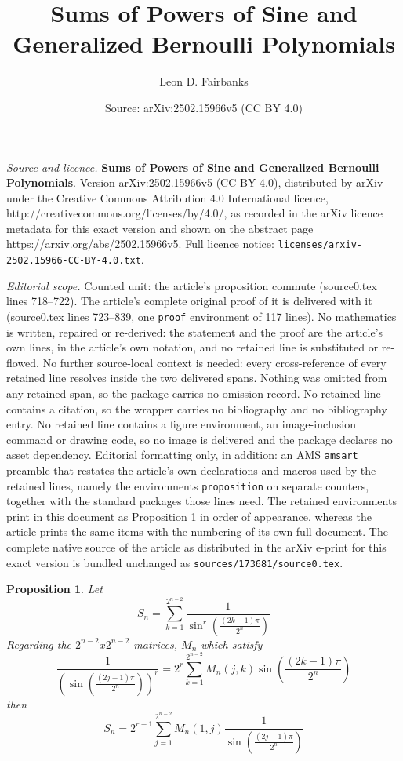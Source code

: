 \documentclass[10pt,a4paper]{amsart}
\title{{\textbf{Sums of Powers of Sine and Generalized Bernoulli Polynomials}}}
\author{Leon D. Fairbanks}
\date{Source: arXiv:2502.15966v5 (CC BY 4.0)}
\newtheorem{proposition}{Proposition}
\begin{document}
\maketitle

\noindent\emph{Source and licence.} {\textbf{Sums of Powers of Sine and Generalized Bernoulli Polynomials}}. Version arXiv:2502.15966v5 (CC BY 4.0), distributed by arXiv under the Creative Commons Attribution 4.0 International licence, http://creativecommons.org/licenses/by/4.0/, as recorded in the arXiv licence metadata for this exact version and shown on the abstract page https://arxiv.org/abs/2502.15966v5. Full licence notice: \texttt{licenses/arxiv-2502.15966-CC-BY-4.0.txt}.\par\smallskip

\noindent\textit{Editorial scope.} Counted unit: the article's proposition commute (source0.tex lines 718--722). The article's complete original proof of it is delivered with it (source0.tex lines 723--839, one \texttt{proof} environment of 117 lines). No mathematics is written, repaired or re-derived: the statement and the proof are the article's own lines, in the article's own notation, and no retained line is substituted or re-flowed.  No further source-local context is needed: every cross-reference of every retained line resolves inside the two delivered spans.  Nothing was omitted from any retained span, so the package carries no omission record.  No retained line contains a citation, so the wrapper carries no bibliography and no bibliography entry.  No retained line contains a figure environment, an image-inclusion command or drawing code, so no image is delivered and the package declares no asset dependency.  Editorial formatting only, in addition: an AMS \texttt{amsart} preamble that restates the article's own declarations and macros used by the retained lines, namely the environments \texttt{proposition} on separate counters, together with the standard packages those lines need.  The retained environments print in this document as Proposition 1 in order of appearance, whereas the article prints the same items with the numbering of its own full document.  The complete native source of the article as distributed in the arXiv e-print for this exact version is bundled unchanged as \texttt{sources/173681/source0.tex}.
\begin{proposition}\label{commute}
Let $$S_n=\sum_{k=1}^{2^{n-2}}\frac{1}{\sin^r(\frac{(2k-1)\pi}{2^n})}$$
Regarding the $2^{n-2}x2^{n-2}$ matrices, $M_n$ which satisfy $$\frac{1}{(\sin(\frac{(2j-1)\pi}{2^n}))^r}=2^r \sum_{k=1}^{2^{n-2}}M_n(j,k)\sin(\frac{(2k-1)\pi}{2^n})\label{mequa}$$
then $$S_n=2^{r-1} \sum_{j=1}^{2^{n-2}}M_n(1,j)\frac{1}{\sin(\frac{(2j-1)\pi}{2^n})}$$
\end{proposition}
\end{document}
